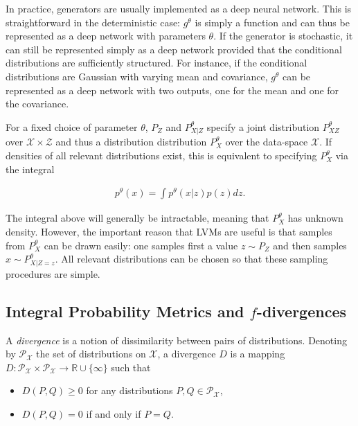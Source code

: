 In practice, generators are usually implemented as a deep neural network.
This is straightforward in the deterministic case: $g^\theta$ is simply a function and can thus be represented as a deep network with parameters $\theta$.
If the generator is stochastic, it can still be represented simply as a deep network provided that the conditional distributions are sufficiently structured. 
For instance, if the conditional distributions are Gaussian with varying mean and covariance, $g^\theta$ can be represented as a deep network with two outputs, one for the mean and one for the covariance.

For a fixed choice of parameter $\theta$, $P_Z$ and $P^\theta_{X|Z}$ specify a joint distribution $P^\theta_{XZ}$ over $\mathcal{X} \times \mathcal{Z}$ and thus a distribution distribution $P_X^\theta$ over the data-space $\mathcal{X}$. 
If densities of all relevant distributions exist, this is equivalent to specifying $P_X^\theta$ via the integral

\begin{align*}
p^\theta(x) = \int p^\theta(x|z) p(z) dz.
\end{align*}

The integral above will generally be intractable, meaning that $P_X^\theta$ has unknown density.
However, the important reason that LVMs are useful is that samples from $P_X^\theta$ can be drawn easily:
one samples first a value $z\sim P_Z$ and then samples $x \sim P^\theta_{X|Z=z}$. 
All relevant distributions can be chosen so that these sampling procedures are simple.


\subsection{Integral Probability Metrics and $f$-divergences}\label{subsec:gen-model-divergence}

A \emph{divergence} is a notion of dissimilarity between pairs of distributions. 
Denoting by $\mathcal{P}_{\mathcal{X}}$ the set of distributions on $\mathcal{X}$, a divergence $D$ is a mapping $D: \mathcal{P}_{\mathcal{X}} \times \mathcal{P}_{\mathcal{X}} \to \mathbb{R} \cup \{\infty\}$ such that

\begin{itemize}
\item $D(P, Q)  \geq 0$ for any distributions $P, Q \in \mathcal{P}_{\mathcal{X}}$,
\item $D(P, Q) = 0$ if and only if $P = Q$.
\end{itemize}

